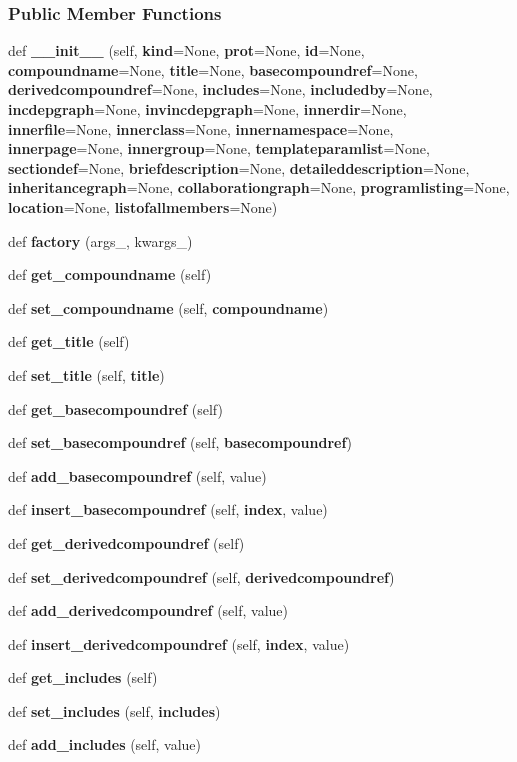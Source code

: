 \subsubsection*{Public Member Functions}
\begin{DoxyCompactItemize}
\item 
def {\bf \+\_\+\+\_\+init\+\_\+\+\_\+} (self, {\bf kind}=None, {\bf prot}=None, {\bf id}=None, {\bf compoundname}=None, {\bf title}=None, {\bf basecompoundref}=None, {\bf derivedcompoundref}=None, {\bf includes}=None, {\bf includedby}=None, {\bf incdepgraph}=None, {\bf invincdepgraph}=None, {\bf innerdir}=None, {\bf innerfile}=None, {\bf innerclass}=None, {\bf innernamespace}=None, {\bf innerpage}=None, {\bf innergroup}=None, {\bf templateparamlist}=None, {\bf sectiondef}=None, {\bf briefdescription}=None, {\bf detaileddescription}=None, {\bf inheritancegraph}=None, {\bf collaborationgraph}=None, {\bf programlisting}=None, {\bf location}=None, {\bf listofallmembers}=None)
\item 
def {\bf factory} (args\+\_\+, kwargs\+\_\+)
\item 
def {\bf get\+\_\+compoundname} (self)
\item 
def {\bf set\+\_\+compoundname} (self, {\bf compoundname})
\item 
def {\bf get\+\_\+title} (self)
\item 
def {\bf set\+\_\+title} (self, {\bf title})
\item 
def {\bf get\+\_\+basecompoundref} (self)
\item 
def {\bf set\+\_\+basecompoundref} (self, {\bf basecompoundref})
\item 
def {\bf add\+\_\+basecompoundref} (self, value)
\item 
def {\bf insert\+\_\+basecompoundref} (self, {\bf index}, value)
\item 
def {\bf get\+\_\+derivedcompoundref} (self)
\item 
def {\bf set\+\_\+derivedcompoundref} (self, {\bf derivedcompoundref})
\item 
def {\bf add\+\_\+derivedcompoundref} (self, value)
\item 
def {\bf insert\+\_\+derivedcompoundref} (self, {\bf index}, value)
\item 
def {\bf get\+\_\+includes} (self)
\item 
def {\bf set\+\_\+includes} (self, {\bf includes})
\item 
def {\bf add\+\_\+includes} (self, value)
\item 

\end{DoxyCompactItemize}
